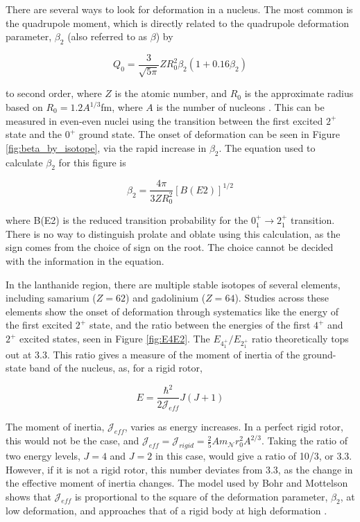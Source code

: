 

There are several ways to look for deformation in a nucleus. The most common is the quadrupole moment, which is directly related to the quadrupole deformation parameter, $\beta_2$ (also referred to as $\beta$) by

\begin{equation}
    Q_0 = \frac{3}{\sqrt{5\pi}}ZR_0^2\beta_2\left(1+0.16\beta_2\right)
\end{equation}

to second order, where $Z$ is the atomic number, and $R_0$ is the approximate radius based on $R_0=1.2A^{1/3}$fm, where $A$ is the number of nucleons \citep{casten90:_structure}. This can be measured in even-even nuclei using the transition between the first excited $2^+$ state and the $0^+$ ground state. The onset of deformation can be seen in Figure \ref{fig:beta_by_isotope}, via the rapid increase in $\beta_2$. The equation used to calculate $\beta_2$ for this figure is 

\begin{equation}
    \beta_2 = \frac{4\pi}{3ZR^2_0}\left[B(E2)\right]^{1/2}
\end{equation}

where B(E2) is the reduced transition probability for the $0^+_1\rightarrow2^+_1$ transition. There is no way to distinguish prolate and oblate using this calculation, as the sign comes from the choice of sign on the root. The choice cannot be decided with the information in the equation.



In the lanthanide region, there are multiple stable isotopes of several elements, including samarium ($Z=62$) and gadolinium ($Z=64$). Studies across these elements show the onset of deformation through systematics like the energy of the first excited $2^+$ state, and the ratio between the energies of the first $4^+$ and $2^+$ excited states, seen in Figure \ref{fig:E4E2}. The $E_{4^+_1}/E_{2^+_1}$ ratio theoretically tops out at 3.3. This ratio gives a measure of the moment of inertia of the ground-state band of the nucleus, as, for a rigid rotor,

\begin{equation}
    E=\frac{\hbar^2}{2\mathscr{J}_{eff}}J(J+1)
\end{equation}

The moment of inertia, $\mathscr{J}_{eff}$, varies as energy increases. In a perfect rigid rotor, this would not be the case, and $\mathscr{J}_{eff}=\mathscr{J}_{rigid}=\frac{2}{5}Am_{\mathscr{N}}r_0^2A^{2/3}$. Taking the ratio of two energy levels, $J=4$ and $J=2$ in this case, would give a ratio of 10/3, or 3.3. However, if it is not a rigid rotor, this number deviates from 3.3, as the change in the effective moment of inertia changes. The model used by Bohr and Mottelson shows that $\mathscr{J}_{eff}$ is proportional to the square of the deformation parameter, $\beta_2$, at low deformation, and approaches that of a rigid body at high deformation \citep{bohr55:_deformation}.

